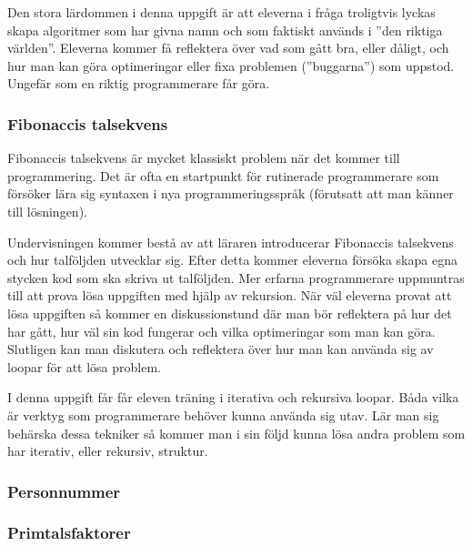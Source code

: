     \textcolor{WildStrawberry}{
        Den stora lärdommen i denna uppgift är att eleverna i fråga troligtvis lyckas skapa algoritmer som har givna namn och som faktiskt används i ''den riktiga världen''.  Eleverna kommer få reflektera över vad som gått bra, eller dåligt, och hur man kan göra optimeringar eller fixa problemen (''buggarna'') som uppstod. Ungefär som en riktig programmerare får göra. \todo{:)}}
        
    
\subsubsection{Fibonaccis talsekvens}
    \label{sec:Fib}
    
    \textcolor{WildStrawberry}{
        Fibonaccis talsekvens är mycket klassiskt problem när det kommer till programmering. Det är ofta en startpunkt för rutinerade programmerare som försöker lära sig syntaxen i nya programmeringsspråk (förutsatt att man känner till lösningen). }
        
    \textcolor{WildStrawberry}{
        Undervisningen kommer bestå av att läraren introducerar Fibonaccis talsekvens och hur talföljden utvecklar sig. Efter detta kommer eleverna försöka skapa egna stycken kod som ska skriva ut talföljden. Mer erfarna programmerare uppmuntras till att prova lösa uppgiften med hjälp av rekursion. När väl eleverna provat att lösa uppgiften så kommer en diskussionstund där man bör reflektera på hur det har gått, hur väl sin kod fungerar och vilka optimeringar som man kan göra. Slutligen kan man diskutera och reflektera över hur man kan använda sig av loopar för att lösa problem.}
        
    \textcolor{WildStrawberry}{
        I denna uppgift får får eleven träning i iterativa och rekursiva loopar. Båda vilka är verktyg som programmerare behöver kunna använda sig utav. Lär man sig behärska dessa tekniker så kommer man i sin följd kunna lösa andra problem som har iterativ, eller rekursiv, struktur.}
        
\subsubsection{Personnummer}
    \label{sec:Pnr}
    
    \textcolor{WildStrawberry}{
        }
        
\subsubsection{Primtalsfaktorer}
    \label{sec:Primtal}
    
